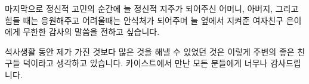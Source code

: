 \documentclass[master,english,final,pdfdoc]{kaist-ucs-improved}
\begin{document}
	마지막으로 정신적 고민의 순간에 늘 정신적 지주가 되어주신 어머니, 아버지, 그리고 힘들 때는 응원해주고 어려울때는 안식처가 되어주며 늘 옆에서 지켜준 여자친구 은이에게 무한한 감사의 말씀을 전하고 싶습니다.

	
	석사생활 동안 제가 가진 것보다 많은 것을 해낼 수 있었던 것은 이렇게 주변의 좋은 친구들 덕이라고 생각하고 있습니다.
	카이스트에서 만난 모든 분들에게 너무나 감사드립니다.
\fi


\iffinal
	
\fi

  \label{paperlastpagelabel}     %
\end{document}
